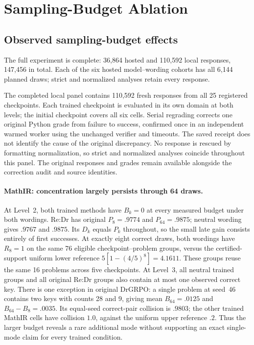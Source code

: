 \documentclass{article}
\newcommand{\1}{\mathbf 1}
\theoremstyle{remark}
\theoremstyle{definition}
\theoremstyle{plain}
\begin{document}
\clearpage
\section{Sampling-Budget Ablation}
\label{app:sampling-budget-ablation}







\subsection{Observed sampling-budget effects}
\label{app:sampling-budget-effects}

The full experiment is complete: 36,864 hosted and 110,592 local responses,
147,456 in total. Each of the six hosted model--wording cohorts has all
6,144 planned draws; strict and normalized analyses retain every response.

The completed local panel contains 110,592 fresh responses from all 25
registered checkpoints. Each trained checkpoint is evaluated in its own domain
at both levels; the initial checkpoint covers all six cells. Serial regrading
corrects one original Python grade from failure to success, confirmed once
in an independent warmed worker using the unchanged verifier and timeouts.
The saved receipt does not identify the cause of the original discrepancy.
No response is rescued by formatting normalization, so strict and normalized
analyses coincide throughout this panel. The original responses and grades
remain available alongside the correction audit and source identities.

\paragraph{MathIR: concentration largely persists through 64 draws.}
At Level~2, both trained methods have $B_k=0$ at every measured budget under
both wordings. Re:Dr has original $P_8=.9774$ and $P_{64}=.9875$;
neutral wording gives $.9767$ and $.9875$. Its $D_k$ equals $P_k$ throughout,
so the small late gain consists entirely of first successes. At exactly eight
correct draws, both wordings have $R_8=1$ on the same 76 eligible
checkpoint--problem groups, versus the certified-support uniform lower
reference $5[1-(4/5)^8]=4.1611$. These groups reuse the same 16 problems
across five checkpoints. At Level~3, all neutral trained groups and all
original Re:Dr groups also contain at most one observed correct key.
There is one exception in original DrGRPO: a single problem at seed~46
contains two keys with counts 28 and 9, giving mean $B_{64}=.0125$ and
$B_{64}-B_8=.0035$. Its equal-seed correct-pair collision is $.9803$;
the other trained MathIR cells have collision $1.0$, against the uniform
upper reference $.2$. Thus the larger budget reveals a rare additional mode
without supporting an exact single-mode claim for every trained condition.
\end{document}
